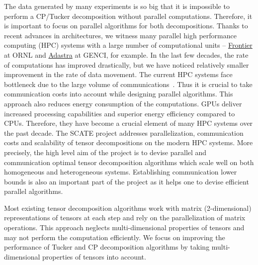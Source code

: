 \documentclass[a4paper,11pt]{article}
\begin{document}
	
	The data generated by many experiments is so big that it is impossible to perform a CP/Tucker decomposition without parallel computations. Therefore, it is important to focus on parallel algorithms for both decompositions. Thanks to recent advances in architectures, we witness many parallel high performance computing (HPC) systems with a large number of computational units
	-- \href{https://www.olcf.ornl.gov/frontier}{Frontier} at ORNL and \href{https://www.genci.fr/en/our-computers}{Adastra} at GENCI, for example. In the last few decades, the rate of computations has improved drastically, but we have noticed relatively smaller improvement in the rate of data movement. The current HPC systems face bottleneck due to the large volume of communications~\cite{DOE-Report-2014}. Thus it is crucial to take communication costs into account while designing parallel algorithms. This approach also reduces energy consumption of the computations. GPUs deliver increased processing capabilities and superior energy efficiency compared to CPUs. Therefore, they have become a crucial element of many HPC systems over the past decade. The SCATE project addresses parallelization, communication costs and scalability of tensor decompositions on the modern HPC systems. More precisely, the high level aim of the project is to devise parallel and communication optimal tensor decomposition algorithms which scale well on both homogeneous and heterogeneous systems. Establishing communication lower bounds is also an important part of the project as it helps one to devise efficient parallel algorithms.
	
	
	Most existing tensor decomposition algorithms work with matrix (2-dimensional) representations of tensors at each step and rely on the parallelization of matrix operations. This approach neglects multi-dimensional properties of tensors and may not perform the computation efficiently. We focus on improving the performance of Tucker and CP decomposition algorithms by taking multi-dimensional properties of tensors into account.
	
	
	
\end{document}
